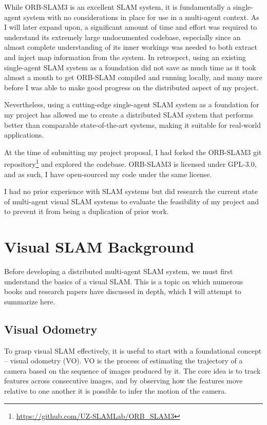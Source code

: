 While ORB-SLAM3 is an excellent SLAM system, it is fundamentally a single-agent system with no considerations in place for use in a multi-agent context. As I will later expand upon, a significant amount of time and effort was required to understand its extremely large undocumented codebase, especially since an almost complete understanding of its inner workings was needed to both extract and inject map information from the system. In retrospect, using an existing single-agent SLAM system as a foundation did not save as much time as it took almost a month to get ORB-SLAM compiled and running locally, and many more before I was able to make good progress on the distributed aspect of my project.

Nevertheless, using a cutting-edge single-agent SLAM system as a foundation for my project has allowed me to create a distributed SLAM system that performs better than comparable state-of-the-art systems, making it suitable for real-world applications.

At the time of submitting my project proposal, I had forked the ORB-SLAM3 git repository\footnote[1]{\url{https://github.com/UZ-SLAMLab/ORB_SLAM3}} and explored the codebase. ORB-SLAM3 is licensed under GPL-3.0, and as such, I have open-sourced my code under the same license.

I had no prior experience with SLAM systems but did research the current state of multi-agent visual SLAM systems to evaluate the feasibility of my project and to prevent it from being a duplication of prior work.


\section{Visual SLAM Background}
\label{sec:visual-slam-background}
Before developing a distributed multi-agent SLAM system, we must first understand the basics of a visual SLAM. This is a topic on which numerous books \autocite{gao2021introduction}\autocite{XiangGao} and research papers \autocite{durrant2006simultaneous} \autocite{taketomi2017visual} \autocite{10.1007} have discussed in depth, which I will attempt to summarize here. %

\subsection{Visual Odometry}
\label{sec:visual-slam-visual-odometry}
To grasp visual SLAM effectively, it is useful to start with a foundational concept – visual odometry (VO). VO is the process of estimating the trajectory of a camera based on the sequence of images produced by it. The core idea is to track features across consecutive images, and by observing how the features move relative to one another it is possible to infer the motion of the camera.

